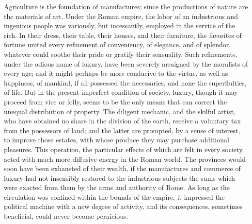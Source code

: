 Agriculture is the foundation of manufactures; since the
productions of nature are the materials of art. Under the Roman
empire, the labor of an industrious and ingenious people was
variously, but incessantly, employed in the service of the rich.
In their dress, their table, their houses, and their furniture,
the favorites of fortune united every refinement of conveniency,
of elegance, and of splendor, whatever could soothe their pride
or gratify their sensuality. Such refinements, under the odious
name of luxury, have been severely arraigned by the moralists of
every age; and it might perhaps be more conducive to the virtue,
as well as happiness, of mankind, if all possessed the
necessaries, and none the superfluities, of life. But in the
present imperfect condition of society, luxury, though it may
proceed from vice or folly, seems to be the only means that can
correct the unequal distribution of property. The diligent
mechanic, and the skilful artist, who have obtained no share in
the division of the earth, receive a voluntary tax from the
possessors of land; and the latter are prompted, by a sense of
interest, to improve those estates, with whose produce they may
purchase additional pleasures. This operation, the particular
effects of which are felt in every society, acted with much more
diffusive energy in the Roman world. The provinces would soon
have been exhausted of their wealth, if the manufactures and
commerce of luxury had not insensibly restored to the industrious
subjects the sums which were exacted from them by the arms and
authority of Rome. As long as the circulation was confined within
the bounds of the empire, it impressed the political machine with
a new degree of activity, and its consequences, sometimes
beneficial, could never become pernicious.

